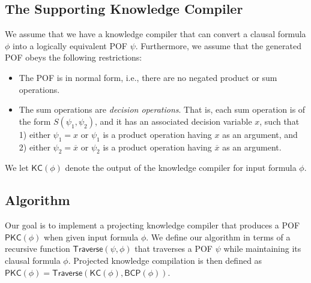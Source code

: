 \documentclass[letterpaper,USenglish,cleveref, autoref, thm-restate]{lipics-v2021}
\newcommand{\obar}[1]{\overline{#1}}
\newcommand{\algo}[1]{\textsf{#1}}
\newcommand{\kc}{\algo{KC}}
\newcommand{\pkc}{\algo{PKC}}
\newcommand{\traverse}{\algo{Traverse}}
\newcommand{\bcp}{\algo{BCP}}
\begin{document}
\subsection{The Supporting Knowledge Compiler}

We assume that we have a knowledge compiler that can convert a clausal formula $\phi$ into a logically equivalent POF $\psi$.  Furthermore, we assume that the generated POF obeys the following restrictions:
\begin{itemize}
\item The POF is in normal form, i.e., there are no negated product or sum operations.
\item The sum operations are \emph{decision operations}.  That is, each sum operation is of the form $S(\psi_1, \psi_2)$, and it has an associated decision variable $x$,
  such that 1) either $\psi_1 = x$ or $\psi_1$ is a product operation having $x$ as an argument, and 2)
either $\psi_2 = \obar{x}$ or $\psi_2$ is a product operation having $\obar{x}$ as an argument.
\end{itemize}
We let $\kc(\phi)$ denote the output of the knowledge compiler for input formula $\phi$.

\subsection{Algorithm}

Our goal is to implement a projecting knowledge compiler that produces a POF $\pkc(\phi)$ when given input formula $\phi$.
We define our algorithm in terms of a recursive function $\traverse(\psi, \phi)$ that traverses a POF $\psi$ while maintaining its clausal formula $\phi$.  Projected knowledge compilation is then defined
as $\pkc(\phi) = \traverse(\kc(\phi), \bcp(\phi))$.
\end{document}
